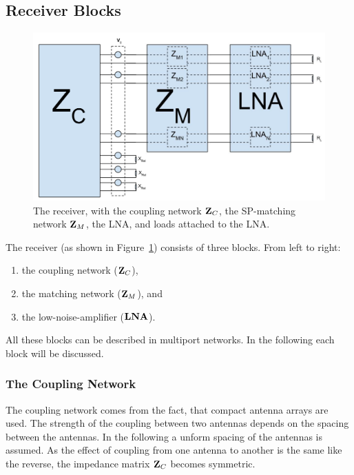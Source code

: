 \subsection{Receiver Blocks}
\begin{figure}[h]
\centering
  \includegraphics[width=\linewidth]{images/Receiver.png}
\caption{The receiver, with the coupling network $\mathbf{Z}_C$, the SP-matching network $\mathbf{Z}_M$, the LNA, and loads attached to the LNA.}
\label{fig:receiver}
\end{figure}
The receiver (as shown in Figure~\ref{fig:receiver}) consists of three blocks.
From left to right:
\begin{enumerate}
\item{the coupling network ($\mathbf{Z}_C$),}
\item{the matching network ($\mathbf{Z}_M$), and}
\item{the low-noise-amplifier ($\mathbf{LNA}$).}
\end{enumerate}
 
All these blocks can be described in multiport networks.
In the following each block will be discussed.

\subsubsection{The Coupling Network}
\label{sec:coupling_network}
The coupling network comes from the fact, that compact antenna arrays are used.
The strength of the coupling between two antennas depends on the spacing between the antennas.
In the following a unform spacing of the antennas is assumed.
As the effect of coupling from one antenna to another is the same like the reverse, the impedance matrix $\mathbf{Z}_C$ becomes symmetric.


